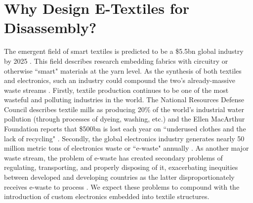 
\section{Why Design E-Textiles for Disassembly?}

The emergent field of smart textiles is predicted to be a \$5.5bn global industry by 2025 \cite{research_global_2019}. This field describes research embedding fabrics with circuitry or otherwise ``smart" materials at the yarn level. As the synthesis of both textiles and electronics, such an industry could compound the two's already-massive waste streams \cite{noauthor_smart_2012, circular_fashion,WEARSustain_network}. Firstly, textile production continues to be one of the most wasteful and polluting industries in the world. The National Resources Defense Council describes textile mills as producing 20\% of the world's industrial water pollution (through processes of dyeing, washing, etc.) \cite{noauthor_encourage_nodate} and the Ellen MacArthur Foundation reports that \$500bn is lost each year on ``underused clothes and the lack of recycling" \cite{circular_fashion}. Secondly, the global electronics industry generates nearly 50 million metric tons of electronics waste or ``e-waste" annually \cite{rifat_breaking_2019}. As another major waste stream, the problem of e-waste has created secondary problems of regulating, transporting, and properly disposing of it, exacerbating inequities between developed and developing countries as the latter disproportionately receives e-waste to process \cite{Zhang:2011:DAU:2347504.2347511, raghavan_means_2017}. We expect these problems to compound with the introduction of custom electronics embedded into textile structures.

